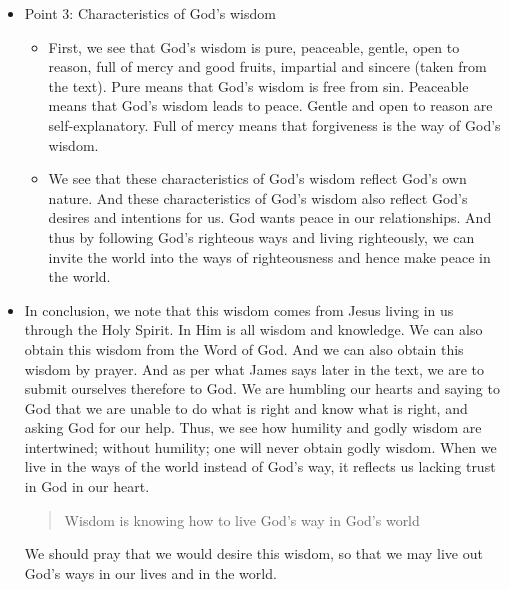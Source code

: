 \begin{itemize}
{\begin{itemize}
  \end{itemize} }
  \item{Point 3: Characteristics of God's wisdom
  \begin{itemize}
    \item First, we see that God's wisdom is pure, peaceable, gentle, open to
    reason, full of mercy and good fruits, impartial and sincere (taken from
    the text). Pure means that God's wisdom is free from sin. Peaceable means
    that God's wisdom leads to peace. Gentle and open to reason are
    self-explanatory. Full of mercy means that forgiveness is the way of
    God's wisdom.
    \item We see that these characteristics of God's wisdom reflect God's own
    nature. And these characteristics of God's wisdom also reflect God's
    desires and intentions for us. God wants peace in our relationships. And
    thus by following God's righteous ways and living righteously, we can
    invite the world into the ways of righteousness and hence make peace in
    the world.
  \end{itemize}}
  \item{In conclusion, we note that this wisdom comes from Jesus living in us
  through the Holy Spirit. In Him is all wisdom and knowledge. We can also
  obtain this wisdom from the Word of God. And we can also obtain this wisdom
  by prayer. And as per what James says later in the text, we are to submit ourselves therefore to God. We are humbling our hearts and saying to God that we are unable to do what is right and know what is right, and asking God for our help. Thus, we see how humility and godly wisdom are intertwined; without humility; one will never obtain godly wisdom. When we live in the ways of the world instead of God's way, it reflects us lacking trust in God in our heart.
  \begin{quotation}
    Wisdom is knowing how to live God's way in God's world
  \end{quotation}
  We should pray that we would desire this wisdom, so that we may live out God's ways in our lives and in the world.
  }
\end{itemize}